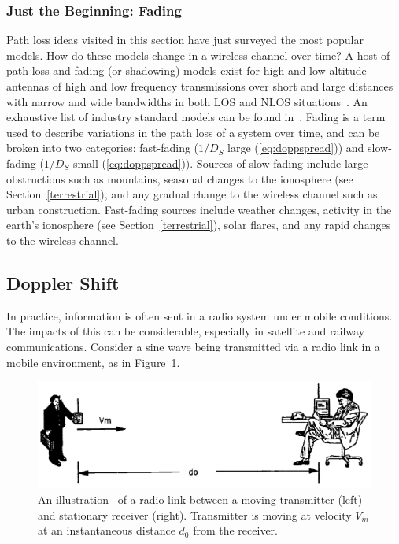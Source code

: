 \subsubsection{Just the Beginning: Fading}
Path loss ideas visited in this section have just surveyed the most popular models. How do these models change in a wireless channel over time? A host of path loss and fading (or shadowing) models exist for high and low altitude antennas of high and low frequency transmissions over short and large distances with narrow and wide bandwidths in both LOS and NLOS situations~\cite{tsb88tia,rappaport1996wireless,pahlavan2005wireless}. An exhaustive list of industry standard models can be found in~\cite{tsb88tia}. Fading is a term used to describe variations in the path loss of a system over time, and can be broken into two categories: fast-fading ($1/D_S$ large (\ref{eq:doppspread})) and slow-fading ($1/D_S$ small (\ref{eq:doppspread})). Sources of slow-fading include large obstructions such as mountains, seasonal changes to the ionosphere (see Section~\ref{terrestrial}), and any gradual change to the wireless channel such as urban construction.  Fast-fading sources include weather changes, activity in the earth's ionosphere (see Section~\ref{terrestrial}), solar flares, and any rapid changes to the wireless channel.

\subsection{Doppler Shift}
In practice, information is often sent in a radio system under mobile conditions. The impacts of this can be considerable, especially in satellite and railway communications. Consider a sine wave being transmitted via a radio link in a mobile environment, as in Figure~\ref{fig:mobil_illust}.

\FloatBarrier
\begin{figure}[ht!]
	\centering	\includegraphics[width=1\textwidth,keepaspectratio]{figs/doppler_graphic.png}
    \caption{An illustration~\cite{pahlavan2005wireless} of a radio link between a moving transmitter (left) and stationary receiver (right). Transmitter is moving at velocity $V_m$ at an instantaneous distance $d_0$ from the receiver.} 
\label{fig:mobil_illust}      
\end{figure}
\FloatBarrier

